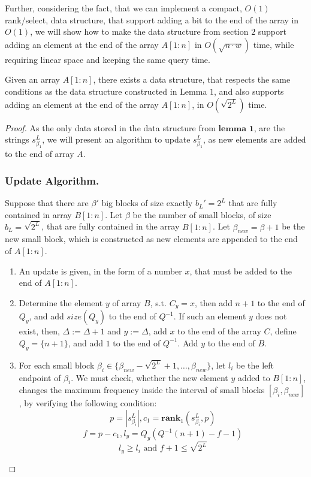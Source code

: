 \documentclass[runningheads]{llncs}
\begin{document}
Further, considering the fact, that we can implement a compact, $O(1)$ rank/select, data structure, that support adding a bit to the 
end of the array in $O(1)$, we will show how to make the data structure from section $2$ support adding an element at the end of the 
array $A[1:n]$ in $O(\sqrt {n \cdot w} )$ time, while requiring linear space and keeping the same query time.



\begin{lemma}
    Given an array $A[1:n]$, there exists a data structure, that respects the same conditions as the data structure constructed in 
    Lemma $1$, and also supports adding an element at the end of the array $A[1:n]$, in $O(\sqrt{2^L})$ time.

\end{lemma}
\begin{proof}
    As the only data stored in the data structure from $\textbf{lemma 1}$, are the strings $s^L_{\beta_1}$, we will present an algorithm to update $s^L_{\beta_1}$, 
    as new elements are added to the end of array $A$.
    
    \subsubsection{Update Algorithm.}
    Suppose that there are $\beta'$ big blocks of size exactly $b_L'=2^L$ that are fully contained in array $B[1:n]$. 
    Let $\beta$ be the number of small blocks, of size $b_L=\sqrt{2^L}$, that are fully contained in the array $B[1:n]$. 
    Let $\beta_{new}=\beta+1$ be the new small block, which is constructed as new elements are appended to the end of $A[1:n]$.


    
    \begin{enumerate}
        \item[] An update is given, in the form of a number $x$, that must be added to the end of $A[1:n]$.
        
        \item Determine the element $y$ of array $B$, s.t. $C_{y}=x$, then add $n+1$ to the end of $Q_{y}$, and add $size(Q_{y})$ to the end of $Q^{-1}$.
        If such an element $y$ does not exist, then, $\Delta := \Delta+1$ and $y:=\Delta$, 
        add $x$ to the end of the array $C$, define $Q_{y}=\{n+1\}$, and add $1$ to the end of $Q^{-1}$. Add $y$ to the end of $B$. 
        
        \item 
        For each small block $\beta_i\in \{ \beta_{new}-\sqrt{2^L}+1, \dots , \beta_{new} \}$, let $l_i$ be the left endpoint of $\beta_i$. 
        We must check, whether the new element $y$ added to $B[1:n]$, changes the maximum frequency 
        inside the interval of small blocks $[\beta_i, \beta_{new}]$, by verifying the following condition:
        \[
            p=|s^{L}_{\beta_i}|, c_1 = \textbf{rank}_1(s^{L}_{\beta_i}, p)
        \]
        \[
            f=p-c_1, l_y = Q_{y}( Q^{-1}(n+1)-f-1 )
        \]
        \[
            l_y \geq l_i \text{ and } f+1\leq \sqrt{2^L}
        \]


\end{enumerate}
\end{proof}
\end{document}
